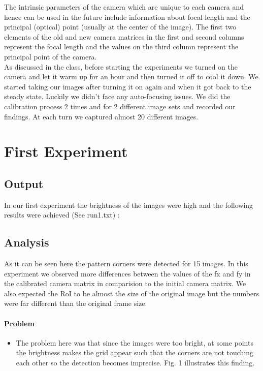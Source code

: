 \documentclass{scrartcl}
\begin{document}
The intrinsic parameters of the camera which are unique to each camera and hence can be used in the future include information about focal length and the principal (optical) point (usually at the center of the image). The first two elements of the old and new camera matrices in the first and second columns represent the focal length and the values on the third column represent the principal point of the camera. \\

As discussed in the class, before starting the experiments we turned on the camera and let it warm up for an hour and then turned it off to cool it down. We started taking our images after turning it on again and when it got back to the steady state. Luckily we didn't face any auto-focusing issues. We did the calibration process 2 times and for 2 different image sets and recorded our findings. At each turn we captured almost 20 different images.\\



\section{First Experiment}

\subsection{Output}

In our first experiment the brightness of the images were high and the following results were achieved (See run1.txt) :\\


 



\subsection{Analysis}

As it can be seen here the pattern corners were detected for 15 images. In this experiment we observed more differences between the values of the fx and fy in the calibrated camera matrix in comparision to the initial camera matrix. We also expected the RoI to be almost the size of the original image but the numbers were far different than the original frame size.\\



\paragraph{Problem}
\begin{itemize}
\item The problem here was that since the images were too bright, at some points the brightness makes the grid appear such that the corners are not touching each other so the detection becomes imprecise. Fig. 1 illustrates this finding.\\
\end{itemize}
\end{document}
